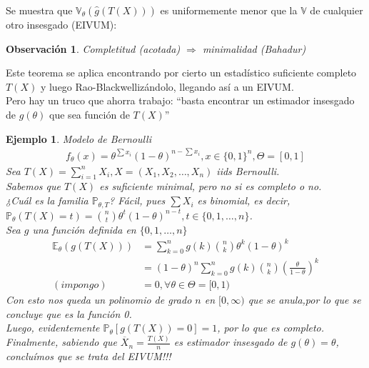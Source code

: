\documentclass[10pt]{article}
\theoremstyle{plain}
\newtheorem{obs}{Observación}
\newtheorem{ej}{Ejemplo}
\theoremstyle{definition}
\begin{document}
Se muestra que $\mathbb{V}_{\theta}(\hat{g}(T(X)))$ es uniformemente menor que la $\mathbb{V}$ de cualquier otro insesgado (EIVUM):

\begin{obs}
Completitud (acotada) $\Rightarrow$ minimalidad (Bahadur)
\end{obs}

Este teorema se aplica encontrando por cierto un estadístico suficiente completo $T(X)$ y luego Rao-Blackwellizándolo, llegando así a un EIVUM.\\
Pero hay un truco que ahorra trabajo: ``basta encontrar un estimador insesgado de $g(\theta)$ que sea función de $T(X)$''

\begin{ej} Modelo de Bernoulli\\
\begin{align*}
f_{\theta}(x) = \theta^{\sum x_{i}}(1-\theta)^{n-\sum x_{i}}, x \in \{0,1\}^n, \Theta = \left[0,1\right]
\end{align*}
Sea $T(X) = \sum_{i=1}^n X_{i}, X = (X_{1},X_{2},\ldots,X_{n})$ iids Bernoulli.\\
Sabemos que $T(X)$ es suficiente minimal, pero no si es completo o no.\\
¿Cuál es la familia $\mathbb{P}_{\theta,T}$? Fácil, pues $\sum X_{i}$ es binomial, es decir, $\mathbb{P}_{\theta}(T(X)=t) = \binom{n}{t} \theta^t (1-\theta)^{n-t}, t \in \{0,1,\ldots,n\}$.\\
Sea $g$ una función definida en $\{0,1,\ldots,n\}$
\begin{align*}
\mathbb{E}_{\theta}(g(T(X))) &= \sum_{k=0}^n g(k) \binom{n}{k} \theta^k(1-\theta)^k\\
&=(1-\theta)^n \sum_{k=0}^n g(k) \binom{n}{k} \left(\frac{\theta}{1-\theta}\right)^k\\
(impongo)\ &= 0, \forall \theta \in \Theta = [0,1)
\end{align*}
Con esto nos queda un polinomio de grado $n$ en $[0,\infty)$ que se anula,por lo que se concluye que es la función 0.\\
Luego, evidentemente $\mathbb{P}_{\theta}[g(T(X))=0] = 1$, por lo que es completo.\\
Finalmente, sabiendo que $\overline{X}_{n} = \frac{T(X)}{n}$ es estimador insesgado de $g(\theta) = \theta$, concluímos que se trata del EIVUM!!!
\end{ej}
\end{document}
